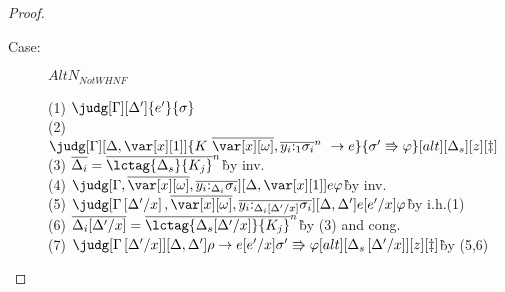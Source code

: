 \begin{proof}
\begin{description}
\item[Case:] $AltN_{Not WHNF}$
\begin{tabbing}
    (1) $\judg[\G][\D']{e'}{\s}$\\
    (2) $\judg[\G][\D,\xl]{\konstructor~\to e}{\s' \Rrightarrow \vp}[alt][\D_s][z][\ddag]$\\
    (3) $\ov{\D_i}=\ov{\lctag{\D_s}{K_j}}^n$\`by inv.\\
    (4) $\judg[\G,\ov{\xo},\ov{y_i{:}_{\D_i}\s_i}][\D,\xl]{e}{\vp}$\`by inv.\\
    (5) $\judg[\subst{\G}{\D'}{x},\ov{\xo},\ov{y_i{:}_{\subst{\D_i}{\D'}{x}}\s_i}][\D,\D']{e[e'/x]}{\vp}$\` by i.h.(1)\\
    (6) $\ov{\D_i[\D'/x]}=\ov{\lctag{\D_s[\D'/x]}{K_j}}^n$\`by (3) and cong.\\
    (7) $\judg[\subst{\G}{\D'}{x}][\D,\D']{\rho \to e[e'/x]}{\s' \Rrightarrow \vp}[alt][\subst{\D_s}{\D'}{x}][z][\ddag]$\` by (5,6)\\
\end{tabbing}


\end{description}
\end{proof}

